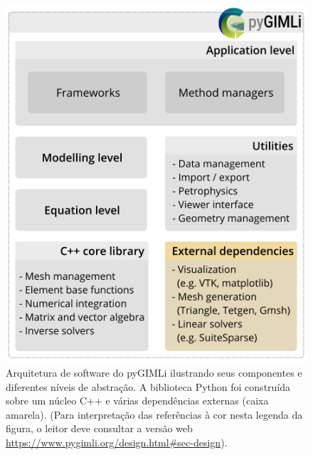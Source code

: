 \documentclass[a4paper, 12 pt]{article} %
\begin{document}
\begin{figure}[!hbtp]
	\begin{center}
		\includegraphics[scale=0.45]{Figuras/arquitetura.png}
	\end{center}
	\caption{Arquitetura de software do pyGIMLi ilustrando seus componentes e diferentes níveis de abstração. A biblioteca Python foi construída sobre um núcleo C++ e várias dependências externas (caixa amarela). (Para interpretação das referências à cor nesta legenda da figura, o leitor deve consultar a versão web \url{https://www.pygimli.org/design.html\#sec-design}).}
	\label{arquitetura-pygimli}
\end{figure} \newpage
\end{document}
